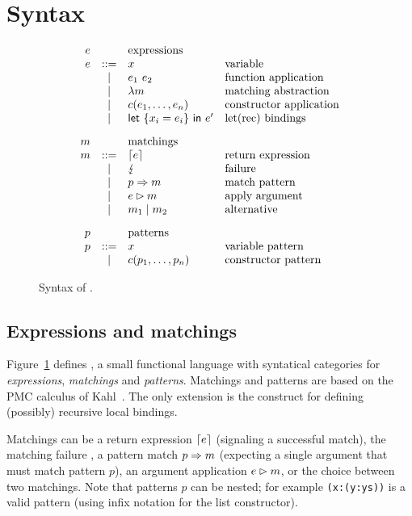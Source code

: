 \section{Syntax}

\begin{figure}
  \[
    \begin{array}{rcll}
      e & &     \text{expressions} \\
      e & ::= &  x  & \text{variable} \\
      & | &  e_1~e_2 & \text{function application} \\
      & | & \lambda m & \text{matching abstraction} \\
      & | &  c(e_1,\ldots,e_n) & \text{constructor application} \\
      & | & \textsf{let}~\{x_i=e_i\}~\textsf{in}~e' & \text{let(rec) bindings} \\[2ex]
      m &  & \text{matchings} \\
      m & ::= & \left\lceil e\right\rceil & \text{return expression}\\
      & | & \lightning & \text{failure} \\
      & | & p \Rightarrow m & \text{match pattern} \\
      & | & e\rhd m & \text{apply argument}\\
      & | & m_1 \mid m_2 & \text{alternative}\\[2ex]
      p & & \text{patterns}\\
      p & ::= & x & \text{variable pattern} \\
      & | & c(p_1,\ldots,p_n) & \text{constructor pattern} 
  \end{array}
\]
\caption{Syntax of \lambdaPMC.}\label{fig:syntax}
\end{figure}

\subsection{Expressions and matchings}
Figure~\ref{fig:syntax} defines \lambdaPMC, a small functional
language with syntatical categories for \emph{expressions},
\emph{matchings} and \emph{patterns}.  Matchings and patterns are
based on the PMC calculus of Kahl~\cite{kahl_2004}.
The only extension is the \llet{\ldots}{\ldots} construct
for defining (possibly) recursive local bindings.

Matchings can be a return expression $\left\lceil e\right\rceil$ (signaling a
successful match), the matching failure \matchfail,
a pattern match $p \Rightarrow m$ (expecting a
single argument that must match pattern $p$), an argument application
$e\rhd m$, or the choice  between two
matchings.  Note that patterns $p$ can be nested; for example
\verb|(x:(y:ys))| is a valid pattern (using infix notation for the
list constructor).

